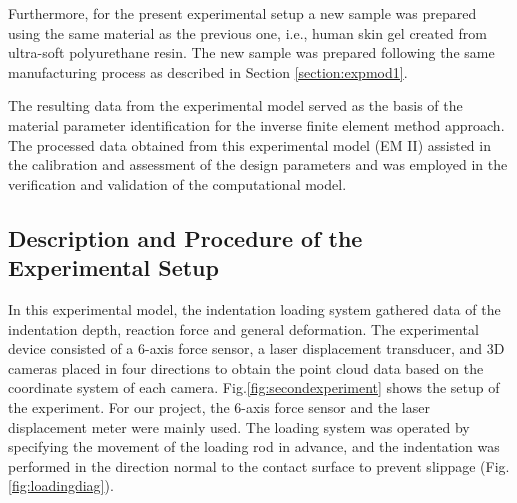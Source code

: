 Furthermore, for the present experimental setup a new sample was prepared using 
the same material as the previous one, i.e., human skin gel created from ultra-soft 
polyurethane resin. The new sample was prepared following the same 
manufacturing process as described in Section \ref{section:expmod1}. 

The resulting data from the experimental model served as the basis of the material 
parameter identification for the inverse finite element method approach.
The processed data obtained from this experimental model (EM II) assisted in the calibration 
and assessment of the design parameters and was employed in the verification and validation of the 
computational model. 

\subsection*{Description and Procedure of the Experimental Setup}
In this experimental model, the indentation loading system gathered data of the indentation 
depth, reaction force and general deformation. 
The experimental device consisted of a 6-axis force sensor, a laser displacement transducer,
and 3D cameras placed in four directions to obtain the point cloud data based on the 
coordinate system of each camera. Fig.\ref{fig:secondexperiment} shows the setup of the 
experiment. For our project, the 6-axis force sensor and the laser displacement meter were mainly used.
The loading system was operated by specifying the movement of the loading rod in advance, and the 
indentation was performed in the direction normal to the contact surface to prevent slippage (Fig. \ref{fig:loadingdiag}).\\


